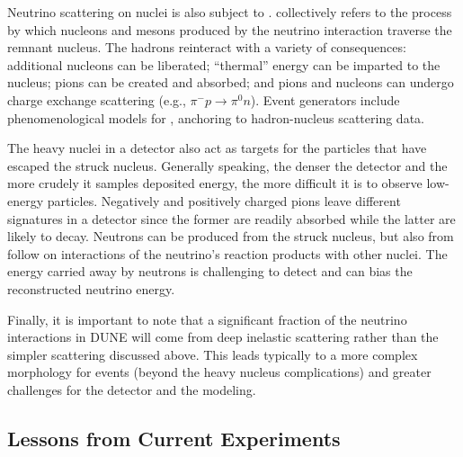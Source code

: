 Neutrino scattering on nuclei is also subject to .  collectively refers to the process by which nucleons and mesons produced by the neutrino interaction traverse the remnant nucleus. The hadrons reinteract with a variety of consequences: additional nucleons can be liberated; ``thermal'' energy can be imparted to the nucleus; pions can be created and absorbed; and pions and nucleons can undergo charge exchange scattering (e.g., $\pi^- p \to \pi^0 n$).  Event generators include phenomenological models for , anchoring to hadron-nucleus scattering data.



The heavy nuclei in a detector also act as targets for the particles that have escaped the struck nucleus. Generally speaking, the denser the detector and the more crudely it samples deposited energy, the more difficult it is to observe low-energy particles. Negatively and positively charged pions leave different signatures in a detector since the former are readily absorbed while the latter are likely to decay.  Neutrons can be produced from the struck nucleus, but also from follow on interactions of the neutrino's reaction products with other nuclei. The energy carried away by neutrons is challenging to detect and can bias the reconstructed neutrino energy. 

Finally, it is important to note that a significant fraction of the neutrino interactions in DUNE will come from deep inelastic scattering rather than the 
simpler  scattering discussed above.  This leads typically to a more complex morphology for events (beyond the heavy nucleus complications) and greater challenges for the detector and the modeling.  


\subsection{Lessons from Current Experiments}
\label{ssec:exsum-nd-overview-lessons}

